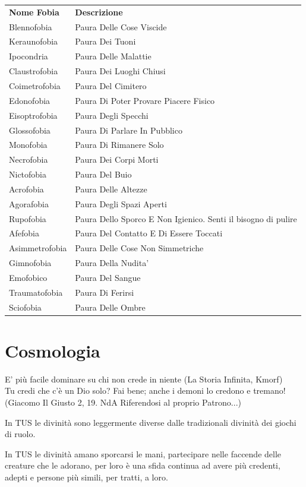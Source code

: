 \documentclass[a4paper,11pt,twoside,openany]{book}
\begin{document}
\begin{tabularx}{\textwidth}{lX}
	\toprule
	\textbf{Nome Fobia} & \textbf{Descrizione}\tabularnewline
	Blennofobia         & Paura Delle Cose Viscide\tabularnewline
	Keraunofobia        & Paura Dei Tuoni\tabularnewline
	Ipocondria          & Paura Delle Malattie\tabularnewline
	Claustrofobia       & Paura Dei Luoghi Chiusi\tabularnewline
	Coimetrofobia       & Paura Del Cimitero\tabularnewline
	Edonofobia          & Paura Di Poter Provare Piacere Fisico\tabularnewline
	Eisoptrofobia       & Paura Degli Specchi\tabularnewline
	Glossofobia         & Paura Di Parlare In Pubblico\tabularnewline
	Monofobia           & Paura Di Rimanere Solo\tabularnewline
	Necrofobia          & Paura Dei Corpi Morti\tabularnewline
	Nictofobia          & Paura Del Buio\tabularnewline
	Acrofobia           & Paura Delle Altezze\tabularnewline
	Agorafobia          & Paura Degli Spazi Aperti\tabularnewline
	Rupofobia           & Paura Dello Sporco E Non Igienico. Senti il bisogno di pulire\tabularnewline
	Afefobia            & Paura Del Contatto E Di Essere Toccati\tabularnewline
	Asimmetrofobia      & Paura Delle Cose Non Simmetriche\tabularnewline
	Gimnofobia          & Paura Della Nudita'\tabularnewline
	Emofobico           & Paura Del Sangue\tabularnewline
	Traumatofobia       & Paura Di Ferirsi\tabularnewline
	Sciofobia           & Paura Delle Ombre\tabularnewline
\end{tabularx}

\pagebreak

\section{Cosmologia}

\label{cosmologia}
\begin{tcolorbox}[enhanced,arc=5pt,boxrule=0.3pt]{
		E' più facile dominare su chi non crede in niente (La Storia Infinita, Kmorf)\\
		Tu credi che c'è un Dio solo? Fai bene; anche i demoni lo credono e tremano! (Giacomo Il Giusto 2, 19. NdA Riferendosi al proprio Patrono...)}\end{tcolorbox}\medskip

In TUS le divinità sono leggermente diverse dalle tradizionali divinità dei giochi di ruolo.

In TUS le divinità amano sporcarsi le mani, partecipare nelle faccende delle creature che le adorano, per loro è una sfida continua ad avere più credenti, adepti e persone più simili, per tratti, a loro.
\end{document}
